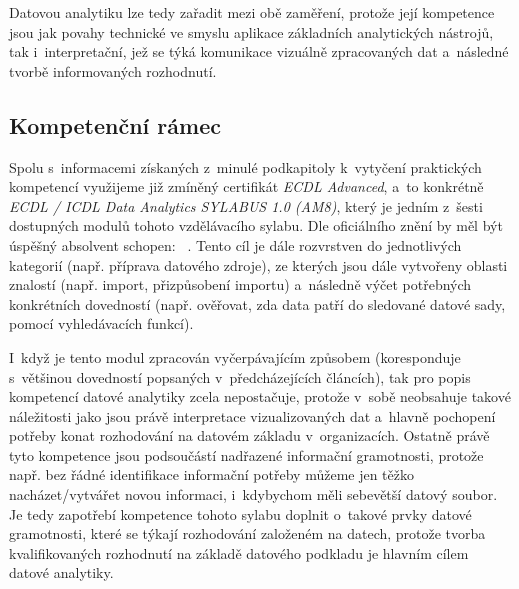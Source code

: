 Datovou analytiku lze tedy zařadit mezi obě zaměření, protože její kompetence jsou jak povahy technické ve smyslu aplikace základních analytických nástrojů, tak i~interpretační, jež se týká komunikace vizuálně zpracovaných dat a~následné tvorbě informovaných rozhodnutí.

\hypertarget{kompetenux10dnuxed-ruxe1mec}{%
\subsection{Kompetenční rámec}\label{kompetenux10dnuxed-ruxe1mec}}

Spolu s~informacemi získaných z~minulé podkapitoly k~vytyčení praktických kompetencí využijeme již zmíněný certifikát \emph{ECDL Advanced}, a~to konkrétně \emph{ECDL / ICDL Data Analytics SYLABUS 1.0 (AM8)}, který je jedním z~šesti dostupných modulů tohoto vzdělávacího sylabu. Dle oficiálního znění by měl být úspěšný absolvent schopen: ~\parencite{ecdl17}. Tento cíl je dále rozvrstven do jednotlivých kategorií (např. příprava datového zdroje), ze kterých jsou dále vytvořeny oblasti znalostí (např. import, přizpůsobení importu) a~následně výčet potřebných konkrétních dovedností (např. ověřovat, zda data patří do sledované datové sady, pomocí vyhledávacích funkcí).

I~když je tento modul zpracován vyčerpávajícím způsobem (koresponduje s~většinou dovedností popsaných v~předcházejících článcích), tak pro popis kompetencí datové analytiky zcela nepostačuje, protože v~sobě neobsahuje takové náležitosti jako jsou právě interpretace vizualizovaných dat a~hlavně pochopení potřeby konat rozhodování na datovém základu v~organizacích. Ostatně právě tyto kompetence jsou podsoučástí nadřazené informační gramotnosti, protože např. bez řádné identifikace informační potřeby můžeme jen těžko nacházet/vytvářet novou informaci, i~kdybychom měli sebevětší datový soubor. Je tedy zapotřebí kompetence tohoto sylabu doplnit o~takové prvky datové gramotnosti, které se týkají rozhodování založeném na datech, protože tvorba kvalifikovaných rozhodnutí na základě datového podkladu je hlavním cílem datové analytiky.

